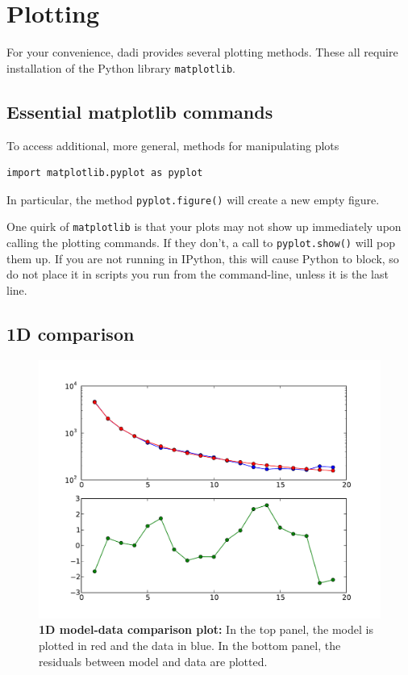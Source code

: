 \documentclass[12pt]{article}
\makeatletter
\newcommand{\dadi}{dadi\xspace}
\newcommand{\py}[1]{\lstinline[language=Python, showstringspaces=False]@#1@}
\makeatother
\begin{document}
\section{Plotting}

For your convenience, \dadi provides several plotting methods.
These all require installation of the Python library \py{matplotlib}.

\subsection{Essential matplotlib commands}
To access additional, more general, methods for manipulating plots
\begin{lstlisting}
import matplotlib.pyplot as pyplot
\end{lstlisting}
In particular, the method \py{pyplot.figure()} will create a new empty figure.

One quirk of \py{matplotlib} is that your plots may not show up immediately upon calling the plotting commands.
If they don't, a call to \py{pyplot.show()} will pop them up.
If you are not running in IPython, this will cause Python to block, so do not place it in scripts you run from the command-line, unless it is the last line.

\subsection{1D comparison}

\begin{figure}
\centering
\includegraphics[scale=0.5]{1d_comp}
\caption{\textbf{1D model-data comparison plot:} In the top panel, the model is plotted in red and the data in blue. In the bottom panel, the residuals between model and data are plotted.\label{fig:1d_comp}}
\end{figure}
\end{document}

